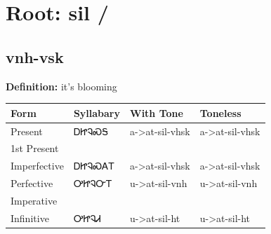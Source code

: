 \documentclass{article}%
\begin{document}
%
\normalsize%
\section*{Root: sil / }%
\subsection*{vnh-vsk}%
\textbf{Definition: }%
it’s blooming%
\\[0.5em]%
\begin{tabular}{|l|l|l|l|}%
\hline%
\textbf{Form}&\textbf{Syllabary}&\textbf{With Tone}&\textbf{Toneless}\\%
\hline%
Present&ᎠᏥᎸᏍᎦ&a{-}>at{-}sil{-}vhsk&a{-}>at{-}sil{-}vhsk\\%
1st Present&&&\\%
Imperfective&ᎠᏥᎸᏍᎪᎢ&a{-}>at{-}sil{-}vhsk&a{-}>at{-}sil{-}vhsk\\%
Perfective&ᎤᏥᎸᏅᎢ&u{-}>at{-}sil{-}vnh&u{-}>at{-}sil{-}vnh\\%
Imperative&&&\\%
Infinitive&ᎤᏥᎸᏗ&u{-}>at{-}sil{-}ht&u{-}>at{-}sil{-}ht\\%
\hline%
\end{tabular}%
\\[1em]%
\end{document}
